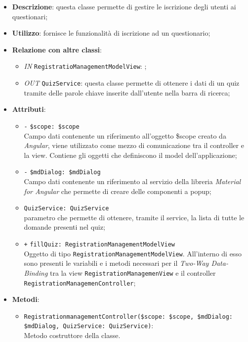 \begin{itemize}
	\item \textbf{Descrizione}: questa classe permette di gestire le iscrizione degli utenti ai questionari;
	\item \textbf{Utilizzo}: fornisce le funzionalità di iscrizione ad un questionario;
	\item \textbf{Relazione con altre classi}:
	\begin{itemize}
		\item \textit{IN} \texttt{RegistratioManagementModelView}: ; 
		\item \textit{OUT} \texttt{QuizService}: questa classe permette di ottenere i dati di un quiz tramite delle parole chiave inserite dall'utente nella barra di ricerca;
	\end{itemize}
	\item \textbf{Attributi}:
	\begin{itemize}
		\item \texttt{-} \texttt{\$scope: \$scope} \\
		Campo dati contenente un riferimento all’oggetto \$scope creato da \textit{Angular}, viene utilizzato come mezzo di comunicazione tra il controller e la view. Contiene gli oggetti che definiscono il model dell’applicazione;
		\item \texttt{-} \texttt{\$mdDialog: \$mdDialog} \\
		Campo dati contenente un riferimento al servizio della libreria \textit{Material for Angular} che permette di creare delle componenti a popup;
		\item \texttt{QuizService: QuizService}\\ parametro che permette di ottenere, tramite il service, la lista di tutte le domande presenti nel quiz;
		\item \texttt{+} \texttt{fillQuiz: RegistrationManagementModelView} \\
		Oggetto di tipo \texttt{RegistrationManagementModelView}. All'interno di esso sono presenti le variabili e i metodi necessari per il \textit{Two-Way Data-Binding} tra la view \texttt{RegistrationManagemenView} e il controller \texttt{RegistrationManagemenController};
	\end{itemize}
	\item \textbf{Metodi}:
	\begin{itemize}
		\item \texttt{RegistrationmanagementController(\$scope: \$scope, \$mdDialog: \$mdDialog, QuizService: QuizService)}: \\Metodo costruttore della classe. \\

\end{itemize}
\end{itemize}
